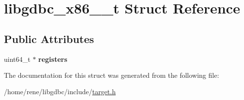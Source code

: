 \hypertarget{structlibgdbc__x86__64__t}{\section{libgdbc\-\_\-x86\-\_\-\_\-t Struct Reference}
\label{structlibgdbc__x86__64__t}
}
\subsection*{Public Attributes}
\begin{DoxyCompactItemize}
\item 
\hypertarget{structlibgdbc__x86__64__t_a511c9633ce147edbaa220805262d468d}{uint64\-\_\-t $\ast$ {\bfseries registers}}\label{structlibgdbc__x86__64__t_a511c9633ce147edbaa220805262d468d}

\end{DoxyCompactItemize}


The documentation for this struct was generated from the following file\-:\begin{DoxyCompactItemize}
\item 
/home/rene/libgdbc/include/\hyperlink{target_8h}{target.\-h}\end{DoxyCompactItemize}
